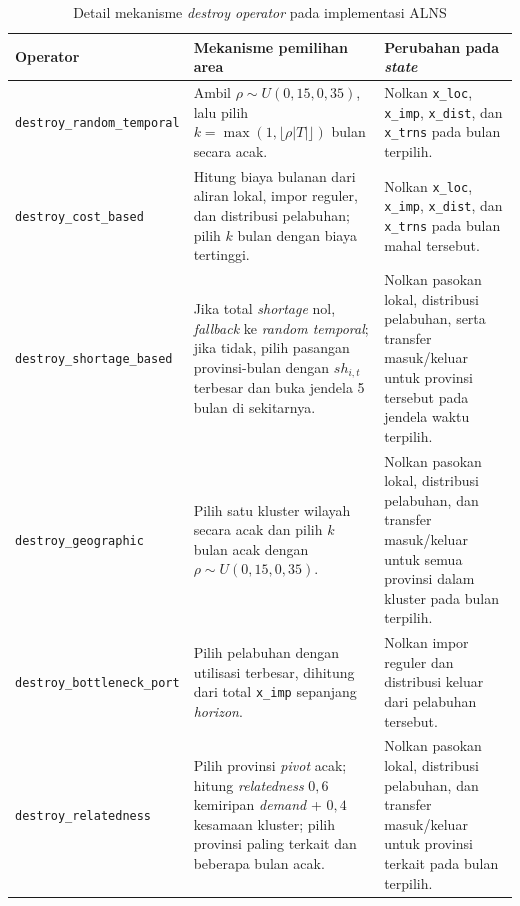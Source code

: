 \documentclass{file/TA-ITS}
\theoremstyle{definition}
\theoremstyle{definition}
\theoremstyle{plain}
\begin{document}
\begin{table}[H]
\centering
\caption{Detail mekanisme \textit{destroy operator} pada implementasi ALNS}
\label{tab:destroy_operator_detail}
\scriptsize
\renewcommand{\arraystretch}{2}
\begin{tabularx}{\textwidth}{@{}p{}p{}X@{}}
\toprule
\textbf{Operator} & \textbf{Mekanisme pemilihan area} & \textbf{Perubahan pada \textit{state}} \\
\midrule
\texttt{destroy\_random\_temporal} & Ambil $\rho \sim U(0{,}15,0{,}35)$, lalu pilih $k=\max(1,\lfloor \rho |T| \rfloor)$ bulan secara acak. & Nolkan \texttt{x\_loc}, \texttt{x\_imp}, \texttt{x\_dist}, dan \texttt{x\_trns} pada bulan terpilih. \\
\texttt{destroy\_cost\_based} & Hitung biaya bulanan dari aliran lokal, impor reguler, dan distribusi pelabuhan; pilih $k$ bulan dengan biaya tertinggi. & Nolkan \texttt{x\_loc}, \texttt{x\_imp}, \texttt{x\_dist}, dan \texttt{x\_trns} pada bulan mahal tersebut. \\
\texttt{destroy\_shortage\_based} & Jika total \textit{shortage} nol, \textit{fallback} ke \textit{random temporal}; jika tidak, pilih pasangan provinsi-bulan dengan $sh_{i,t}$ terbesar dan buka jendela 5 bulan di sekitarnya. & Nolkan pasokan lokal, distribusi pelabuhan, serta transfer masuk/keluar untuk provinsi tersebut pada jendela waktu terpilih. \\
\texttt{destroy\_geographic} & Pilih satu kluster wilayah secara acak dan pilih $k$ bulan acak dengan $\rho \sim U(0{,}15,0{,}35)$. & Nolkan pasokan lokal, distribusi pelabuhan, dan transfer masuk/keluar untuk semua provinsi dalam kluster pada bulan terpilih. \\
\texttt{destroy\_bottleneck\_port} & Pilih pelabuhan dengan utilisasi terbesar, dihitung dari total \texttt{x\_imp} sepanjang \textit{horizon}. & Nolkan impor reguler dan distribusi keluar dari pelabuhan tersebut. \\
\texttt{destroy\_relatedness} & Pilih provinsi \textit{pivot} acak; hitung \textit{relatedness} $0{,}6$ kemiripan \textit{demand} + $0{,}4$ kesamaan kluster; pilih provinsi paling terkait dan beberapa bulan acak. & Nolkan pasokan lokal, distribusi pelabuhan, dan transfer masuk/keluar untuk provinsi terkait pada bulan terpilih. \\
\bottomrule
\end{tabularx}
\renewcommand{\arraystretch}{1}
\end{table}
\end{document}
